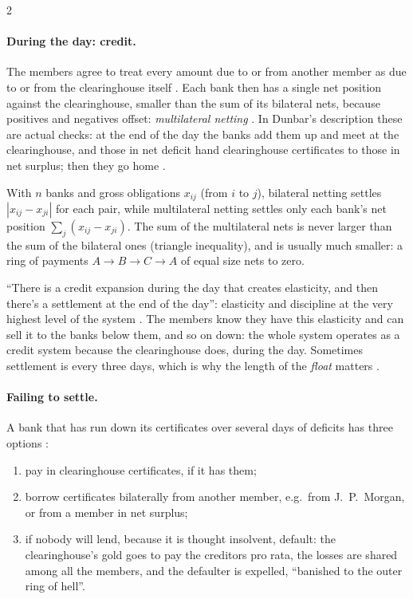 \begin{paracol}{2}
\paragraph{During the day: credit.} The members agree to treat every amount due to or from another member as due to or from the clearinghouse
itself . Each bank then has a single net position against the clearinghouse, smaller than the sum of its bilateral nets,
because positives and negatives offset: \emph{multilateral netting} . In Dunbar's description these are
actual checks: at the end of the day the banks add them up and meet at the clearinghouse, and those in net deficit hand clearinghouse certificates to
those in net surplus; then they go home .

\begin{intuition}
With $n$ banks and gross obligations $x_{ij}$ (from $i$ to $j$), bilateral netting settles $|x_{ij}-x_{ji}|$ for each pair, while multilateral
netting settles only each bank's net position $\sum_j(x_{ij}-x_{ji})$. The sum of the multilateral nets is never larger than the sum of the
bilateral ones (triangle inequality), and is usually much smaller: a ring of payments $A\to B\to C\to A$ of equal size nets to zero.
\end{intuition}

``There is a credit expansion during the day that creates elasticity, and then there's a settlement at the end of the day'': elasticity and
discipline at the very highest level of the system . The members know they have this elasticity and can sell it to the banks
below them, and so on down: the whole system operates as a credit system because the clearinghouse does, during the day. Sometimes settlement is
every three days, which is why the length of the \emph{float} matters .

\paragraph{Failing to settle.} A bank that has run down its certificates over several days of deficits has three options
:
\begin{enumerate}
  \item pay in clearinghouse certificates, if it has them;
  \item borrow certificates bilaterally from another member, e.g.\ from J.~P.~Morgan, or from a member in net surplus;
  \item if nobody will lend, because it is thought insolvent, default: the clearinghouse's gold goes to pay the creditors pro rata, the losses are
        shared among all the members, and the defaulter is expelled, ``banished to the outer ring of hell''.
\end{enumerate}


\end{paracol}
